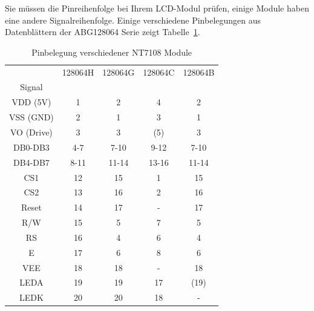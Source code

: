 Sie müssen die Pinreihenfolge bei Ihrem LCD-Modul prüfen, einige Module haben eine andere Signalreihenfolge.
Einige verschiedene Pinbelegungen aus Datenblättern der ABG128064 Serie zeigt Tabelle~\ref{tab:NT7108types}.

\begin{table}[H]
  \begin{center}
    \begin{tabular}{| c || c | c | c | c |}
    \hline
           & 128064H  &  128064G  & 128064C  & 128064B \\
    Signal &         &          &         &         \\
    \hline
    \hline
  VDD (5V) &   1     &  2       &   4     & 2       \\
    \hline
  VSS (GND) &   2     &  1       &   3     & 1       \\
    \hline
 VO (Drive) &   3     &  3       &  (5)    & 3       \\
    \hline
  DB0-DB3   &   4-7   &  7-10    &   9-12  & 7-10    \\
    \hline
  DB4-DB7   &   8-11  &  11-14   &   13-16 & 11-14   \\
    \hline
  CS1       &   12    &  15      &   1     & 15      \\
  CS2       &   13    &  16      &   2     & 16      \\
    \hline
  Reset     &   14    &  17      &   -     & 17      \\
    \hline
  R/W       &   15    &  5       &   7     & 5       \\
    \hline
  RS        &   16    &  4       &   6     & 4       \\
    \hline
  E         &   17    &  6       &   8     & 6       \\
    \hline
  VEE       &   18    &  18      &   -     & 18      \\
    \hline
  LEDA      &   19    &  19      &   17    & (19)      \\
  LEDK      &   20    &  20      &   18    & -      \\
    \hline
    \end{tabular}
  \end{center}
  \caption{Pinbelegung verschiedener NT7108 Module}
  \label{tab:NT7108types}
\end{table}

